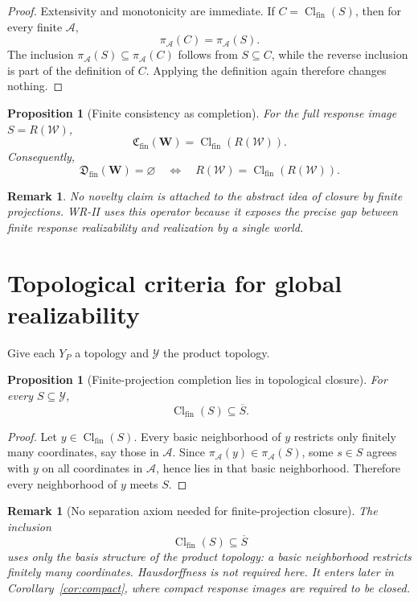 \documentclass[11pt]{article}
\newtheorem{proposition}[definition]{Proposition}
\newtheorem{remark}[definition]{Remark}
\newcommand{\W}{\mathcal W}
\newcommand{\Acal}{\mathcal A}
\newcommand{\Y}{\mathcal Y}
\newcommand{\Cfin}{\mathfrak C_{\mathrm{fin}}}
\newcommand{\Dfin}{\mathfrak D_{\mathrm{fin}}}
\begin{document}
\begin{proof}
Extensivity and monotonicity are immediate. If
$C=\operatorname{Cl}_{\mathrm{fin}}(S)$, then for every finite $\Acal$,
\[
\pi_{\Acal}(C)=\pi_{\Acal}(S).
\]
The inclusion $\pi_{\Acal}(S)\subseteq\pi_{\Acal}(C)$ follows from
$S\subseteq C$, while the reverse inclusion is part of the definition of $C$.
Applying the definition again therefore changes nothing.
\end{proof}

\begin{proposition}[Finite consistency as completion]\label{prop:completion}
For the full response image $S=R(\W)$,
\[
\Cfin(\mathbf W)
=
\operatorname{Cl}_{\mathrm{fin}}(R(\W)).
\]
Consequently,
\[
\Dfin(\mathbf W)=\varnothing
\quad\Longleftrightarrow\quad
R(\W)
=
\operatorname{Cl}_{\mathrm{fin}}(R(\W)).
\]
\end{proposition}

\begin{remark}
No novelty claim is attached to the abstract idea of closure by finite
projections. WR-II uses this operator because it exposes the precise gap
between finite response realizability and realization by a single world.
\end{remark}

\section{Topological criteria for global realizability}

Give each $Y_P$ a topology and $\Y$ the product topology.

\begin{proposition}[Finite-projection completion lies in topological closure]
For every $S\subseteq\Y$,
\[
\operatorname{Cl}_{\mathrm{fin}}(S)
\subseteq
\overline S.
\]
\end{proposition}

\begin{proof}
Let $y\in\operatorname{Cl}_{\mathrm{fin}}(S)$. Every basic neighborhood of
$y$ restricts only finitely many coordinates, say those in $\Acal$. Since
$\pi_{\Acal}(y)\in\pi_{\Acal}(S)$, some $s\in S$ agrees with $y$ on all
coordinates in $\Acal$, hence lies in that basic neighborhood. Therefore every
neighborhood of $y$ meets $S$.
\end{proof}


\begin{remark}[No separation axiom needed for finite-projection closure]
The inclusion
\[
\operatorname{Cl}_{\mathrm{fin}}(S)\subseteq\overline S
\]
uses only the basis structure of the product topology: a basic neighborhood
restricts finitely many coordinates. Hausdorffness is not required here. It
enters later in Corollary~\ref{cor:compact}, where compact response images are
required to be closed.
\end{remark}
\end{document}
